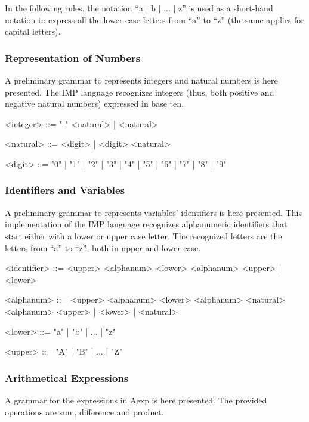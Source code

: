 \documentclass{esposito-documentation}
\begin{document}
In the following rules, the notation ``a $\mid$ b $\mid$ ... $\mid$ z'' is used
as a short-hand notation to express all the lower case letters from ``a'' to
``z'' (the same applies for capital letters).

\subsubsection{Representation of Numbers}\label{sec:grammar-numbers}

A preliminary grammar to represents integers and natural numbers is here
presented. The IMP language recognizes integers (thus, both positive and
negative natural numbers) expressed in base ten.

\begin{grammar}
	<integer> ::= "-" <natural> | <natural>

	<natural> ::= <digit> | <digit> <natural>

	<digit> ::= "0" | "1" | "2" | "3" | "4" | "5" | "6" | "7" | "8" | "9"
\end{grammar}

\subsubsection{Identifiers and Variables}\label{sec:grammar-id}

A preliminary grammar to represents variables' identifiers is here presented.
This implementation of the IMP language recognizes alphanumeric identifiers
that start either with a lower or upper case letter. The recognized letters are
the letters from ``a'' to ``z'', both in upper and lower case.

\begin{grammar}
	<identifier> ::= <upper> <alphanum>
	\alt <lower> <alphanum>
	\alt <upper> | <lower> 
	
	<alphanum> ::= <upper> <alphanum>
	\alt <lower> <alphanum>
	\alt <natural> <alphanum>
	\alt<upper> | <lower> | <natural>

	<lower> ::= "a" | "b" | ... | "z"

	<upper> ::= "A" | "B" | ... | "Z"
\end{grammar}

\subsubsection{Arithmetical Expressions}\label{sec:grammar-aexp}

A grammar for the expressions in $\mathrm{Aexp}$ is here presented. The
provided operations are sum, difference and product.
\end{document}
